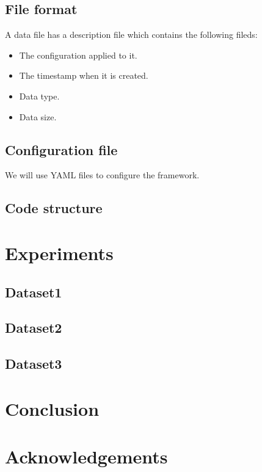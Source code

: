 \documentclass{article}
\begin{document}
    \subsection{File format}
    A data file has a description file which contains the following fileds:

    \begin{itemize}
        \item The configuration applied to it.
        \item The timestamp when it is created.
        \item Data type.
        \item Data size.
    \end{itemize}

    \subsection{Configuration file}
    We will use YAML files to configure the framework.

    \subsection{Code structure}


\section{Experiments}
    \subsection{Dataset1}
    \subsection{Dataset2}
    \subsection{Dataset3}

\section{Conclusion}


\section*{Acknowledgements}
\end{document}
